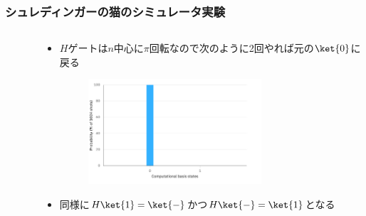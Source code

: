 \begin{frame}
  \frametitle{シュレディンガーの猫のシミュレータ実験}

  \begin{columns}
    \begin{column}{0.4\textwidth}
      \begin{figure}
        \HGateFigure
      \end{figure}
    \end{column}
    \begin{column}{0.6\textwidth}
      \begin{itemize}
        \item $H$ゲートは$n$中心に$\pi$回転なので次のように2回やれば元の$\ket{0}$に戻る
        \begin{figure}
          \centering
        \end{figure}
        \begin{figure}
          \includegraphics[width=0.7\textwidth]{./img/hgate_hgate_histogram.pdf}
        \end{figure}

        \item 同様に$H\ket{1} = \ket{-}$かつ$H\ket{-} = \ket{1}$となる
      \end{itemize}
    \end{column}
  \end{columns}
\end{frame}

